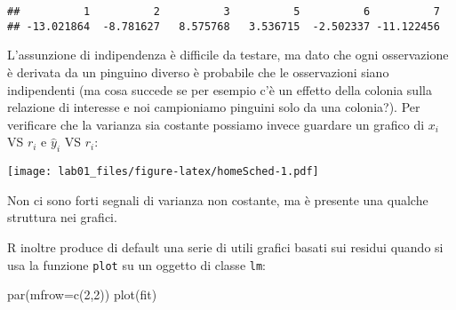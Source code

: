 \documentclass[
]{article}
\newenvironment{Shaded}{\begin{snugshade}}{\end{snugshade}}
\newcommand{\AttributeTok}[1]{\textcolor[rgb]{0.77,0.63,0.00}{#1}}
\newcommand{\DecValTok}[1]{\textcolor[rgb]{0.00,0.00,0.81}{#1}}
\newcommand{\DocumentationTok}[1]{\textcolor[rgb]{0.56,0.35,0.01}{\textbf{\textit{#1}}}}
\newcommand{\FunctionTok}[1]{\textcolor[rgb]{0.00,0.00,0.00}{#1}}
\newcommand{\NormalTok}[1]{#1}
\newcommand{\SpecialCharTok}[1]{\textcolor[rgb]{0.00,0.00,0.00}{#1}}
\newcommand{\StringTok}[1]{\textcolor[rgb]{0.31,0.60,0.02}{#1}}
\begin{document}
\begin{Shaded}
\end{Shaded}

\begin{verbatim}
##          1          2          3          5          6          7 
## -13.021864  -8.781627   8.575768   3.536715  -2.502337 -11.122456
\end{verbatim}

L'assunzione di indipendenza è difficile da testare, ma dato che ogni
osservazione è derivata da un pinguino diverso è probabile che le
osservazioni siano indipendenti (ma cosa succede se per esempio c'è un
effetto della colonia sulla relazione di interesse e noi campioniamo
pinguini solo da una colonia?). Per verificare che la varianza sia
costante possiamo invece guardare un grafico di \(x_i\) VS \(r_i\) e
\(\hat{y}_i\) VS \(r_i\):

\begin{Shaded}
\end{Shaded}

\texttt{[image: lab01\_files/figure-latex/homeSched-1.pdf]}

Non ci sono forti segnali di varianza non costante, ma è presente una
qualche struttura nei grafici.

R inoltre produce di default una serie di utili grafici basati sui
residui quando si usa la funzione \texttt{plot} su un oggetto di classe
\texttt{lm}:

\begin{Shaded}
\begin{Highlighting}[]
\FunctionTok{par}\NormalTok{(}\AttributeTok{mfrow=}\FunctionTok{c}\NormalTok{(}\DecValTok{2}\NormalTok{,}\DecValTok{2}\NormalTok{))}
\FunctionTok{plot}\NormalTok{(fit)}
\end{Highlighting}
\end{Shaded}
\end{document}
